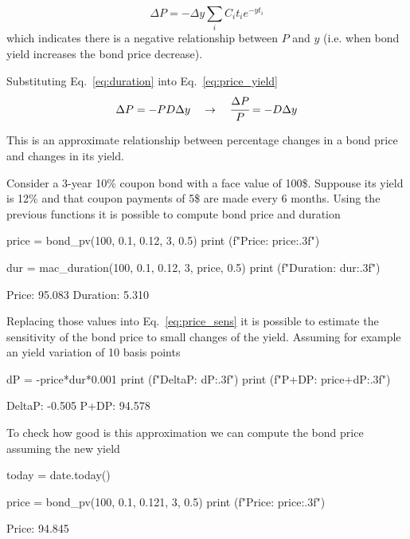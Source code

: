 \begin{equation}
\Delta P = -\Delta y\sum_i C_i t_i e^{-yt_i}
\label{eq:price_yield}
\end{equation}
\noindent
which indicates there is a negative relationship between $P$ and $y$ (i.e. when bond yield increases the bond price decrease). 

Substituting Eq.~\ref{eq:duration} into Eq.~\ref{eq:price_yield} 
\begin{equation}
\Delta P = -PD\Delta y \quad\rightarrow\quad \cfrac{\Delta P}{P} = -D\Delta y
\label{eq:price_sens}
\end{equation}

This is an approximate relationship between percentage changes in a bond price and changes in its yield.

Consider a 3-year 10\% coupon bond with a face value of 100\$. Suppouse its yield is 12\% and that coupon payments of 5\$ are made every 6 months. Using the previous functions it is possible to compute bond price and duration

\begin{ipython}
price = bond_pv(100, 0.1, 0.12, 3, 0.5)
print (f"Price: {price:.3f}")

dur = mac_duration(100, 0.1, 0.12, 3, price, 0.5)
print (f"Duration: {dur:.3f}")
\end{ipython}
\begin{ioutput}
Price: 95.083
Duration: 5.310
\end{ioutput}

Replacing those values into Eq.~\ref{eq:price_sens} it is possible to estimate the sensitivity of the bond price to small changes of the yield.
Assuming for example an yield variation of 10 basis points
\begin{ipython}
dP = -price*dur*0.001
print (f"DeltaP: {dP:.3f}")
print (f"P+DP: {price+dP:.3f}")
\end{ipython}
\begin{ioutput}
DeltaP: -0.505
P+DP: 94.578
\end{ioutput}

To check how good is this approximation we can compute the bond price assuming the new yield
\begin{ipython}
today = date.today()

price = bond_pv(100, 0.1, 0.121, 3, 0.5)
print (f"Price: {price:.3f}")
\end{ipython}
\begin{ioutput}
Price: 94.845
\end{ioutput}

